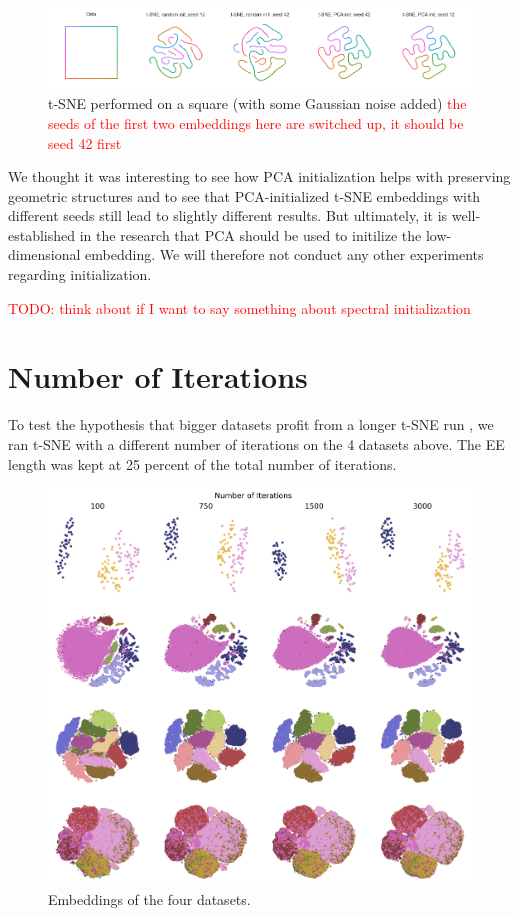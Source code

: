 \begin{figure}[h]
    \centering 
        \includegraphics[width=\linewidth]{figures/t_sne_on_square.png}
        \caption{t-SNE performed on a square (with some Gaussian noise added) \textcolor{red}{the seeds of the first two embeddings here are switched up, it should be seed 42 first}}
    \label{fig:square}
\end{figure}

We thought it was interesting to see how PCA initialization helps with preserving geometric structures and to see that PCA-initialized t-SNE embeddings with different seeds still lead to slightly different results. 
But ultimately, it is well-established in the research that PCA should be used to initilize the low-dimensional embedding. 
We will therefore not conduct any other experiments regarding initialization. 

\textcolor{red}{TODO: think about if I want to say something about spectral initialization}

\section{Number of Iterations}
To test the hypothesis that bigger datasets profit from a longer t-SNE run \cite{belkina19}, we ran t-SNE with a different number of iterations on the 4 datasets above. The EE length was kept at 25 percent of the total number of iterations. 

\begin{figure}[h]
    \centering 
        \includegraphics[width=0.9\linewidth]{figures/n_iter/n_iter_embedding_grid_tab20b.png}
        \caption{Embeddings of the four datasets.}
    \label{fig:n_iter-grid}
\end{figure}

